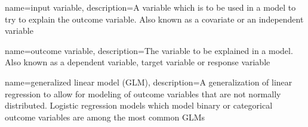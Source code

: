 {
    name={input variable},
    description={A variable which is to be used in a model to try to explain the outcome variable.  Also known as a covariate or an independent variable}
}

{
    name={outcome variable},
    description={The variable to be explained in a model.  Also known as a dependent variable, target variable or response variable}
}

{
    name={generalized linear model (GLM)},
    description={A generalization of linear regression to allow for modeling of outcome variables that are not normally distributed.  Logistic regression models which model binary or categorical outcome variables are among the most common GLMs}
}

\glsaddall

\frontmatter
